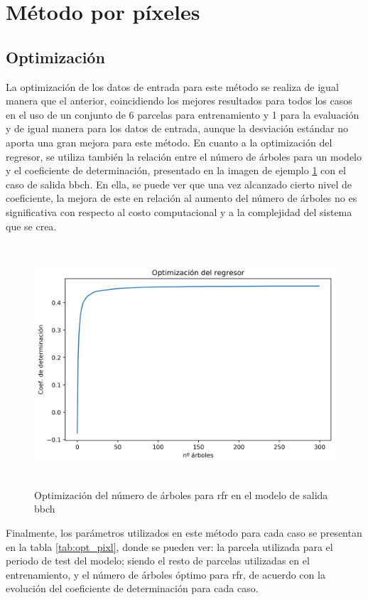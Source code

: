\section{Método por píxeles} 
\subsection{Optimización}
\par La optimización de los datos de entrada para este método se realiza de igual manera que el anterior, coincidiendo los mejores resultados para todos los casos en el uso de un conjunto de 6 parcelas para entrenamiento y 1 para la evaluación y de igual manera para los datos de entrada, aunque la desviación estándar no aporta una gran mejora para este método. En cuanto a la optimización del regresor, se utiliza también la relación entre el número de árboles para un modelo y el coeficiente de determinación, presentado en la imagen de ejemplo \ref{fig:opt_pixl} con el caso de salida \gls{bbch}. En ella, se puede ver que una vez alcanzado cierto nivel de coeficiente, la mejora de este en relación al aumento del número de árboles no es significativa con respecto al costo computacional y a la complejidad del sistema que se crea. 
\begin{figure}[h]
    \centering
    \includegraphics[height=9cm]{archivos/tfg/Pixel/opt_tree_bbch_pixel} 
    \caption{Optimización del número de árboles para \gls{rfr} en el modelo de salida \gls{bbch}}
    \label{fig:opt_pixl}
\end{figure}

\par Finalmente, los parámetros utilizados en este método para cada caso se presentan en la tabla \ref{tab:opt_pixl}, donde se pueden ver: la parcela utilizada para el periodo de test del modelo; siendo el resto de parcelas utilizadas en el entrenamiento, y el número de árboles óptimo para \gls{rfr}, de acuerdo con la evolución del coeficiente de determinación para cada caso.

